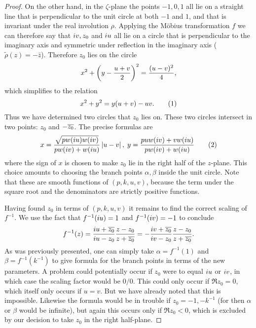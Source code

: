 \begin{lem}
\begin{proof}
On the other hand, in the $ζ$-plane the points $-1,0,1$ all lie on a straight line that is perpendicular to the unit circle at both $-1$ and $1$, and that is invariant under the real involution $ρ$. Applying the M\"obius transformation $f$ we can therefore say that $i v, z_0$ and $i u$ all lie on a circle that is perpendicular to the imaginary axis and symmetric under reflection in the imaginary axis ($\tilde{ρ}(z) = -\bar{z}$). Therefore $z_0$ lies on the circle
\[
x^2 + \left( y - \frac{u+v}{2} \right)^2 = \frac{(u-v)^2}{4},
\]
which simplifies to the relation
\[
x^2 + y^2 = y(u+v) - uv. \labelthis{eqn:z_0_circle}
\]
Thus we have determined two circles that $z_0$ lies on. These two circles intersect in two points: $z_0$ and $-\overline{z_0}$. The precise formulas are
\[
x = \frac{\sqrt{pw(\iu u)w(\iu v)}}{pw(\iu v) + w(\iu u)} \abs{u-v},\; y = \frac{puw(\iu v) + vw(\iu u)}{pw(\iu v) + w(\iu u)}
\labelthis{eqn:formula xy}
\]
where the sign of $x$ is chosen to make $z_0$ lie in the right half of the $z$-plane. This choice amounts to choosing the branch points $α,β$ inside the unit circle. Note that these are smooth functions of $(p,k,u,v)$, because the term under the square root and the denominators are strictly positive functions.

Having found $z_0$ in terms of $(p,k,u,v)$ it remains to find the correct scaling of $f^{-1}$. We use the fact that $f^{-1}(i u) = 1$ and $f^{-1}(i v) = -1$ to conclude
\[
f^{-1}(z)
=  \frac{i u + \overline{z_0}}{i u - z_0} \frac{z-z_0}{z + \overline{z_0}}
=  -\frac{i v + \overline{z_0}}{i v - z_0} \frac{z-z_0}{z + \overline{z_0}}.
\]
As was previously presented, one can simply take $α = f^{-1}(1)$ and $β = f^{-1}(k^{-1})$ to give formula for the branch points in terms of the new parameters. A problem could potentially occur if $z_0$ were to equal $i u$ or $i v$, in which case the scaling factor would be $0/0$. This could only occur if $\Re{z_0}=0$, which itself only occurs if $u=v$. But we have already noted that this is impossible. Likewise the formula would be in trouble if $z_0 = -1, -k^{-1}$ (for then $α$ or $β$ would be infinite), but again this occurs only if $\Re{z_0} < 0$, which is excluded by our decision to take $z_0$ in the right half-plane.


\end{proof}
\end{lem}
